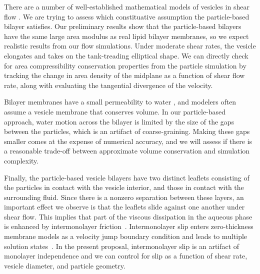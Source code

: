 There are a number of well-established mathematical models of vesicles
in shear flow \cite{torres-sanchez_millan_arroyo_2019, mahapatra_saintillan_rangamani_2020, 
Steigmann99, C6SM02452A}. We are trying to assess which constituative
assumption the particle-based bilayer satisfies. 
Our preliminary results show that the particle-based bilayers have the same
large area modulus as real lipid bilayer membranes, so we expect
realistic results from our flow simulations. Under moderate shear rates,
the vesicle elongates and takes on the tank-treading elliptical shape.
We can directly check for area compressibility conservation properties
from the particle simulation by tracking the change in area density of
the midplane as a function of shear flow rate, along with evaluating the
tangential divergence of the velocity.

Bilayer membranes have a small permeability to water
\cite{323e9a2f0c58487ea82518d7a1f96485}, and modelers often assume a
vesicle membrane that conserves volume. In our particle-based approach,
water motion across the bilayer is limited by the size of the gaps
between the particles, which is an artifact of coarse-graining.  Making
these gaps smaller comes at the expense of numerical accuracy, and we
will assess if there is a reasonable trade-off between approximate
volume conservation and simulation complexity. 

Finally, the particle-based vesicle bilayers have two distinct leaflets
consisting of the particles in contact with the vesicle interior, and
those in contact with the surrounding fluid. Since there is a nonzero
separation between these layers, an important effect we observe is that
the leaflets slide against one another under shear flow.  This implies
that part of the viscous dissipation in the aqueous phase is enhanced by
intermonolayer friction~\cite{SHKULIPA2005823, ShkulipaThesis}.
Intermonolayer slip enters zero-thickness membrane models as a velocity
jump boundary condition and leads to multiple solution
states~\cite{schwalbe_vlahovska_miksis_2010}.  In the present proposal,
intermonolayer slip is an artifact of monolayer independence  and we can
control for slip as a function of shear rate, vesicle diameter, and
particle geometry.



